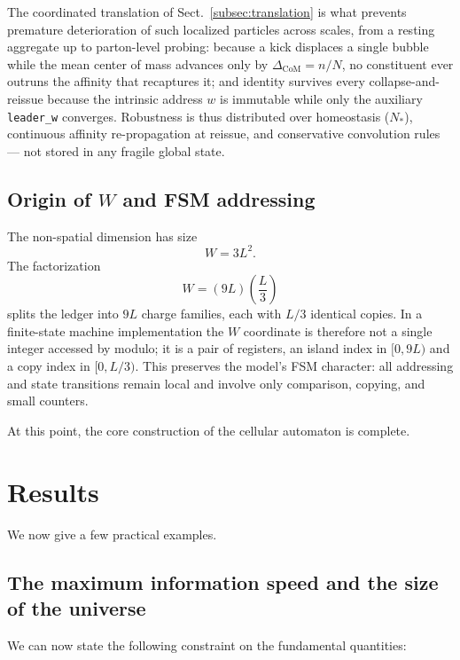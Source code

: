 \documentclass{ijuc}
\begin{document}
The coordinated translation of Sect.~\ref{subsec:translation} is what prevents premature deterioration of such localized particles across scales, from a resting aggregate up to parton-level probing: because a kick displaces a single bubble while the mean center of mass advances only by $\Delta_{\mathrm{CoM}}=n/N$, no constituent ever outruns the affinity that recaptures it; and identity survives every collapse-and-reissue because the intrinsic address $w$ is immutable while only the auxiliary \texttt{leader\_w} converges. Robustness is thus distributed over homeostasis ($N_*$), continuous affinity re-propagation at reissue, and conservative convolution rules — not stored in any fragile global state.

\subsection{Origin of $W$ and FSM addressing}

The non-spatial dimension has size
\begin{equation}
W = 3L^2.
\end{equation}
The factorization
\begin{equation}
W = (9L)\left(\frac{L}{3}\right)
\end{equation}
splits the ledger into $9L$ charge families, each with $L/3$ identical copies. In a finite-state machine implementation the $W$ coordinate is therefore not a single integer accessed by modulo; it is a pair of registers, an island index in $[0,9L)$ and a copy index in $[0,L/3)$. This preserves the model's FSM character: all addressing and state transitions remain local and involve only comparison, copying, and small counters.


At this point, the core construction of the cellular automaton is complete.

\section{Results}\label{sec:Results}

We now give a few practical examples.

\subsection{The maximum information speed and the size of the universe}

We can now state the following constraint on the fundamental quantities:
\end{document}
